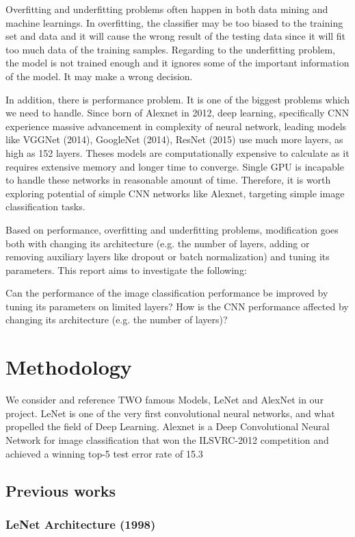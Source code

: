 \documentclass[journal,onecolumn]{IEEEtran}
\begin{document}
Overfitting and underfitting problems often happen in both data mining and machine learnings. In overfitting, the classifier may be too biased to the training set and data and it will cause the wrong result of the testing data since it will fit too much data of the training samples. Regarding to the underfitting problem, the model is not trained enough and it ignores some of the important information of the model. It may make a wrong decision.



In addition, there is performance problem. It is one of the biggest problems which we need to handle. Since born of Alexnet in 2012, deep learning, specifically CNN experience massive advancement in complexity of neural network, leading models like VGGNet (2014), GoogleNet (2014), ResNet (2015) use much more layers, as high as 152 layers. Theses models are computationally expensive to calculate as it requires extensive memory and longer time to converge. Single GPU is incapable to handle these networks in reasonable amount of time. Therefore, it is worth exploring potential of simple CNN networks like Alexnet, targeting simple image classification tasks. 

Based on performance, overfitting and underfitting problems, modification goes both with changing its architecture (e.g. the number of layers, adding or removing auxiliary layers like dropout or batch normalization) and tuning its parameters. This report aims to investigate the following:

Can the performance of the image classification performance be improved by tuning its parameters on limited layers?
How is the CNN performance affected by changing its architecture (e.g. the number of layers)?

\section{Methodology}
We consider and reference TWO famous Models, LeNet and AlexNet in our project. LeNet is one of the very first convolutional neural networks, and what propelled the field of Deep Learning. Alexnet is a Deep Convolutional Neural Network for image classification that won the ILSVRC-2012 competition and achieved a winning top-5 test error rate of 15.3%

\subsection{Previous works}
\subsubsection{LeNet Architecture (1998)}
\end{document}
